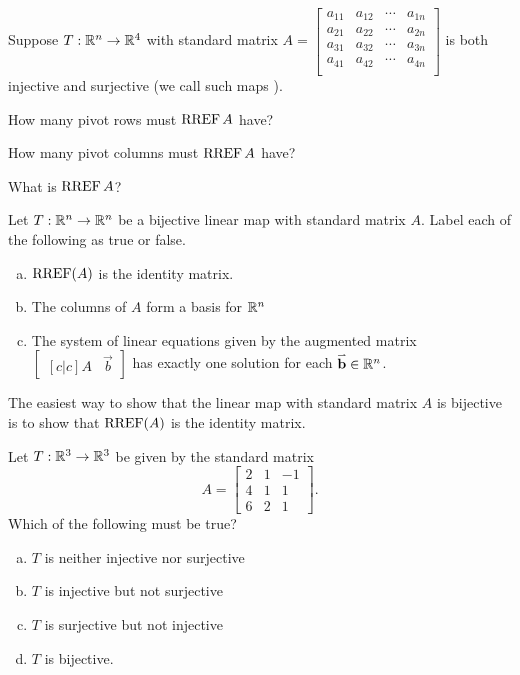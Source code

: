 \begin{activity}{5}
Suppose \(T: \mathbb{R}^n \rightarrow \mathbb{R}^4\) with standard matrix 
\(A=\begin{bmatrix}
  a_{11}&a_{12}&\cdots&a_{1n}\\
  a_{21}&a_{22}&\cdots&a_{2n}\\
  a_{31}&a_{32}&\cdots&a_{3n}\\
  a_{41}&a_{42}&\cdots&a_{4n}\\
\end{bmatrix}\) is both 
injective and surjective (we call such maps ).
\begin{subactivity}
How many pivot rows must \(\operatorname{RREF} A\) have?
\end{subactivity}
\begin{subactivity}
 How many pivot columns must \(\operatorname{RREF} A\) have?
\end{subactivity}
\begin{subactivity}
What is \(\operatorname{RREF} A\)?
\end{subactivity}
\end{activity}


\begin{activity}{5}
Let $T: \mathbb{R}^n \rightarrow \mathbb{R}^n$ be a bijective linear map with
standard matrix $A$. Label each of the following as true or false.
\begin{enumerate}[(a)]
\item $\operatorname{RREF}(A)$ is the identity matrix.
\item The columns of $A$ form a basis for $\mathbb{R}^n$
\item The system of linear equations given by the augmented matrix $\begin{bmatrix}[c|c] A & \vec{b} \end{bmatrix}$ has exactly one solution
for each \(\mathbf{\accentset{\rightharpoonup}{b}} \in \mathbb{R}^n\).
\end{enumerate}
\end{activity}

\begin{observation}
  The easiest way to show that the linear map with standard matrix \(A\)
  is bijective is to show that \(\operatorname{RREF}(A)\) is the identity matrix.
\end{observation}

\begin{activity}{3}
Let $T: \mathbb{R}^3 \rightarrow \mathbb{R}^3$ be given by the standard matrix $$A=\begin{bmatrix} 2&1&-1 \\ 4&1&1 \\ 6&2&1\end{bmatrix}.$$ Which of the following must be true?
\begin{enumerate}[(a)]
\item $T$ is neither injective nor surjective
\item $T$ is injective but not surjective
\item $T$ is surjective but not injective
\item $T$ is bijective.
\end{enumerate}
\end{activity}

